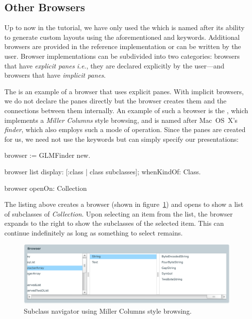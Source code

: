 \documentclass[a4paper,10pt,twoside]{book}
\begin{document}
\subsection{Other Browsers}

Up to now in the tutorial, we have only used the
 which is named after its ability to generate
custom layouts using the aforementioned  and 
keywords. Additional browsers are provided in the reference
implementation or can be written by the user. Browser implementations
can be subdivided into two categories: browsers that have
\emph{explicit panes} \emph{i.e.}, they are declared explicitly by the
user---and browsers that have \emph{implicit panes}.

The  is an example of a browser that uses
explicit panes. With implicit browsers, we do not declare the panes
directly but the browser creates them and the connections between them
internally. An example of such a browser is the , which
implements a \emph{Miller Columns} style browsing, and is named after
Mac~OS~X's \emph{finder}, which also employs such a mode of
operation. Since the panes are created for us, we need not use the
 keywords but can simply specify our presentations:

\begin{code}{}
browser := GLMFinder new.

browser list
  display: [:class | class subclasses];
  whenKindOf: Class.

browser openOn: Collection
\end{code}

The listing above creates a browser (shown in figure~\ref{fig:finder})
and opens to show a list of subclasses of \emph{Collection}. Upon
selecting an item from the list, the browser expands to the right to
show the subclasses of the selected item. This can continue
indefinitely as long as something to select remains.

\begin{figure}[htbp]
\centerline{\includegraphics[width=\linewidth]{finder.pdf}}
\caption{Subclass navigator using Miller Columns style browsing.}
\label{fig:finder}
\end{figure}
\end{document}
